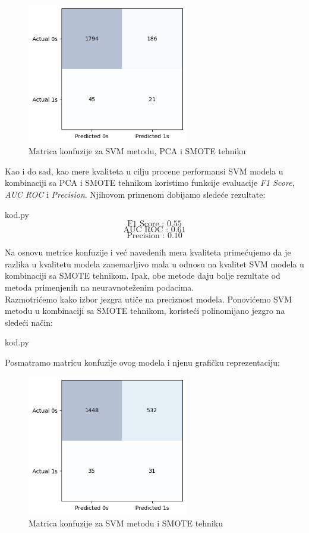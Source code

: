 \documentclass[12pt]{article}
\theoremstyle{definition}
\theoremstyle{remark}
\begin{document}
\begin{figure}[htp]
    \centering
    \includegraphics[width=7cm]{output_81_0.png}
    \caption{Matrica konfuzije za SVM metodu, PCA i SMOTE tehniku}
    \label{fig:galaxy}
\end{figure}

Kao i do sad, kao mere kvaliteta u cilju procene performansi SVM modela u kombinaciji sa PCA i SMOTE tehnikom koristimo funkcije evaluacije  \emph{F1 Score}, \emph{AUC ROC} i \emph{Precision}. Njihovom primenom dobijamo sledeće rezultate:

\hfill

{kod.py}
$$
\text{F1 Score : 0.55}
$$
$$
\text{AUC ROC : 0.61}
$$
$$
\text{Precision : 0.10}
$$
\hfill

Na osnovu metrice konfuzije i već navedenih mera kvaliteta primećujemo da je razlika u kvalitetu modela zanemarljivo mala u odnosu na kvalitet SVM modela u kombinaciji sa SMOTE tehnikom. Ipak, obe metode daju bolje rezultate od metoda primenjenih na neuravnoteženim podacima.\\


Razmotrićemo kako izbor jezgra utiče na preciznost modela. Ponovićemo SVM metodu u kombinaciji sa SMOTE tehnikom, koristeći polinomijano jezgro na sledeći način:

\hfill

{kod.py}

\hfill

Posmatramo matricu konfuzije ovog modela i njenu grafičku reprezentaciju:

\begin{figure}[htp]
    \centering
    \includegraphics[width=7cm]{output_85_0.png}
    \caption{Matrica konfuzije za SVM metodu i SMOTE tehniku}
    \label{fig:galaxy}
\end{figure}
\end{document}
